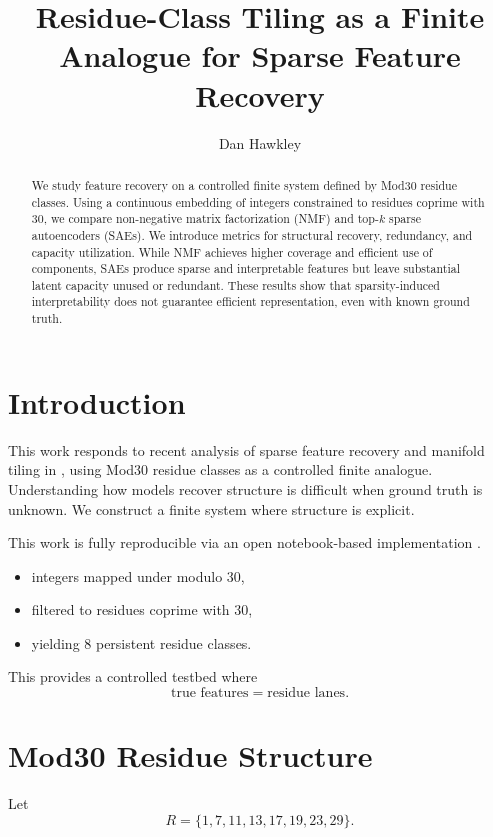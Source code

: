 \documentclass[11pt]{article}
\title{Residue-Class Tiling as a Finite Analogue for Sparse Feature Recovery}
\author{Dan Hawkley}
\date{}
\begin{document}
\maketitle

\begin{abstract}
We study feature recovery on a controlled finite system defined by Mod30 residue classes.
Using a continuous embedding of integers constrained to residues coprime with 30, we compare
non-negative matrix factorization (NMF) and top-$k$ sparse autoencoders (SAEs). We introduce
metrics for structural recovery, redundancy, and capacity utilization. While NMF achieves higher
coverage and efficient use of components, SAEs produce sparse and interpretable features but leave
substantial latent capacity unused or redundant. These results show that sparsity-induced
interpretability does not guarantee efficient representation, even with known ground truth.
\end{abstract}

\section{Introduction}

This work responds to recent analysis of sparse feature recovery and manifold tiling in \cite{mod30_arxiv}, using Mod30 residue classes as a controlled finite analogue. Understanding how models recover structure is difficult when ground truth is unknown. We construct
a finite system where structure is explicit. 

This work is fully reproducible via an open notebook-based implementation \cite{mod30_repo}.

\begin{itemize}
    \item integers mapped under modulo 30,
    \item filtered to residues coprime with 30,
    \item yielding 8 persistent residue classes.
\end{itemize}

This provides a controlled testbed where
\[
    \text{true features} = \text{residue lanes}.
\]

\section{Mod30 Residue Structure}

Let
\[
    R = \{1,7,11,13,17,19,23,29\}.
\]
\end{document}
